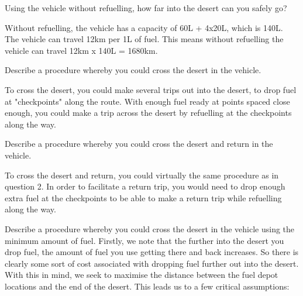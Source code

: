 \documentclass{homework}
\begin{document}
\maketitle


\question Using the vehicle without refuelling, how far into the desert can you safely go?

Without refuelling, the vehicle has a capacity of 60L + 4x20L, which is 140L. The vehicle can travel 12km per 1L of fuel. This means without refuelling the vehicle can travel 12km x 140L = 1680km. 

\question Describe a procedure whereby you could cross the desert in the vehicle.

To cross the desert, you could make several trips out into the desert, to drop fuel at "checkpoints" along the route. With enough fuel ready at points spaced close enough, you could make a trip across the desert by refuelling at the checkpoints along the way.

\question Describe a procedure whereby you could cross the desert and return in the vehicle.

To cross the desert and return, you could virtually the same procedure as in question 2. In order to facilitate a return trip, you would need to drop enough extra fuel at the checkpoints to be able to make a return trip while refuelling along the way.

\question Describe a procedure whereby you could cross the desert in the vehicle using the minimum amount of fuel.
\newline\newline
Firstly, we note that the further into the desert you drop fuel, the amount of fuel you use getting there and back increases. So there is clearly some sort of cost associated with dropping fuel further out into the desert. With this in mind, we seek to maximise the distance between the fuel depot locations and the end of the desert. This leads us to a few critical assumptions:
\end{document}
